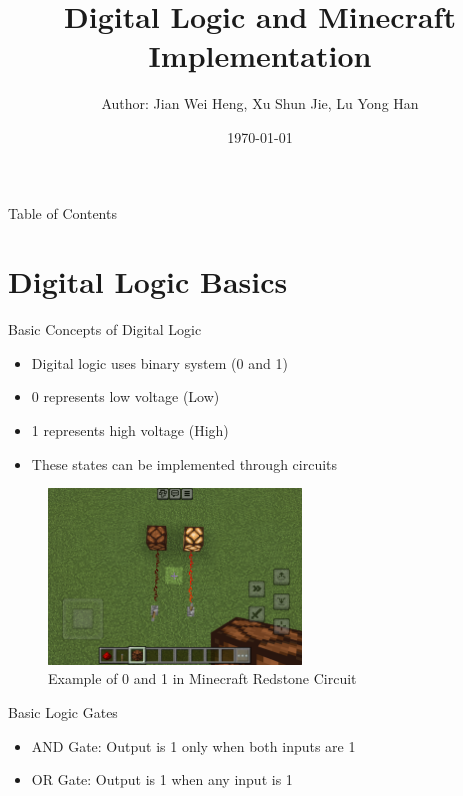\documentclass{beamer}
\title{Digital Logic and Minecraft Implementation}
\author{Author: Jian Wei Heng, Xu Shun Jie, Lu Yong Han}
\institute{Fu Jen Catholic University}
\date{\today}
\begin{document}
\begin{frame}
    \titlepage
\end{frame}

\begin{frame}{Table of Contents}
    \tableofcontents
\end{frame}

\section{Digital Logic Basics}
\begin{frame}{Basic Concepts of Digital Logic}
    \begin{itemize}
        \item Digital logic uses binary system (0 and 1)
        \item 0 represents low voltage (Low)
        \item 1 represents high voltage (High)
        \item These states can be implemented through circuits
    \end{itemize}
    \begin{figure}[ht]
        \centering
        \includegraphics[width=0.6\textwidth]{images/zero_and_one_gate.png}
        \caption{Example of 0 and 1 in Minecraft Redstone Circuit}
    \end{figure}
\end{frame}

\begin{frame}{Basic Logic Gates}
    \begin{itemize}
        \item AND Gate: Output is 1 only when both inputs are 1
        \item OR Gate: Output is 1 when any input is 1
    \end{itemize}
\end{frame}
\end{document}
